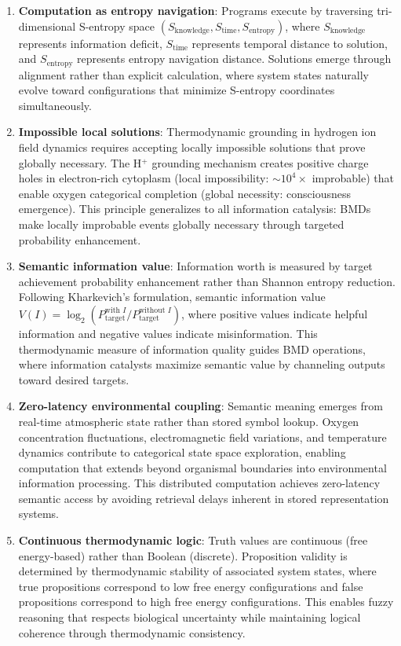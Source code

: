 \documentclass[12pt,a4paper]{article}
\theoremstyle{definition}
\theoremstyle{remark}
\begin{document}
\begin{enumerate}
\item \textbf{Computation as entropy navigation}: Programs execute by traversing tri-dimensional S-entropy space \((S_{\text{knowledge}}, S_{\text{time}}, S_{\text{entropy}})\), where \(S_{\text{knowledge}}\) represents information deficit, \(S_{\text{time}}\) represents temporal distance to solution, and \(S_{\text{entropy}}\) represents entropy navigation distance. Solutions emerge through alignment rather than explicit calculation, where system states naturally evolve toward configurations that minimize S-entropy coordinates simultaneously.

\item \textbf{Impossible local solutions}: Thermodynamic grounding in hydrogen ion field dynamics requires accepting locally impossible solutions that prove globally necessary. The H\(^+\) grounding mechanism creates positive charge holes in electron-rich cytoplasm (local impossibility: \(\sim 10^{4}\times\) improbable) that enable oxygen categorical completion (global necessity: consciousness emergence). This principle generalizes to all information catalysis: BMDs make locally improbable events globally necessary through targeted probability enhancement.

\item \textbf{Semantic information value}: Information worth is measured by target achievement probability enhancement rather than Shannon entropy reduction. Following Kharkevich's formulation, semantic information value \(V(I) = \log_2(P_{\text{target}}^{\text{with } I} / P_{\text{target}}^{\text{without } I})\), where positive values indicate helpful information and negative values indicate misinformation. This thermodynamic measure of information quality guides BMD operations, where information catalysts maximize semantic value by channeling outputs toward desired targets.

\item \textbf{Zero-latency environmental coupling}: Semantic meaning emerges from real-time atmospheric state rather than stored symbol lookup. Oxygen concentration fluctuations, electromagnetic field variations, and temperature dynamics contribute to categorical state space exploration, enabling computation that extends beyond organismal boundaries into environmental information processing. This distributed computation achieves zero-latency semantic access by avoiding retrieval delays inherent in stored representation systems.

\item \textbf{Continuous thermodynamic logic}: Truth values are continuous (free energy-based) rather than Boolean (discrete). Proposition validity is determined by thermodynamic stability of associated system states, where true propositions correspond to low free energy configurations and false propositions correspond to high free energy configurations. This enables fuzzy reasoning that respects biological uncertainty while maintaining logical coherence through thermodynamic consistency.
\end{enumerate}
\end{document}
